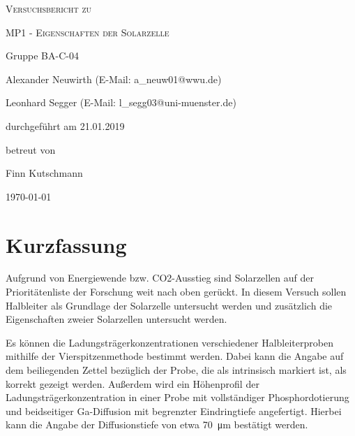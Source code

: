 \documentclass[
	a4paper,
	12pt,
	pagesize,
	ngerman
]{scrartcl}
\begin{document}
	\begin{titlepage}
		\centering
		{\scshape\LARGE Versuchsbericht zu \par}
		\vspace{1cm}
		{\scshape\huge MP1 - Eigenschaften der Solarzelle \par} %
		\vspace{2.5cm}
		{\LARGE Gruppe BA-C-04 \par}
		\vspace{0.5cm}

		{\large Alexander Neuwirth (E-Mail: a\_neuw01@wwu.de) \par}
		{\large Leonhard Segger (E-Mail: l\_segg03@uni-muenster.de) \par}
		\vfill

		durchgeführt am 21.01.2019\par
		betreut von\par
		{\large Finn Kutschmann}

		\vfill

		{\large \today\par}
	\end{titlepage}
	\tableofcontents
	\newpage


	\section{Kurzfassung}
	Aufgrund von Energiewende bzw. CO2-Ausstieg sind Solarzellen auf der Prioritätenliste der Forschung weit nach oben gerückt.
	In diesem Versuch sollen Halbleiter als Grundlage der Solarzelle untersucht werden und zusätzlich die Eigenschaften zweier Solarzellen untersucht werden.

	Es können die Ladungsträgerkonzentrationen verschiedener Halbleiterproben mithilfe der Vierspitzenmethode bestimmt werden.
	Dabei kann die Angabe auf dem beiliegenden Zettel bezüglich der Probe, die als intrinsisch markiert ist, als korrekt gezeigt werden.
	Außerdem wird ein Höhenprofil der Ladungsträgerkonzentration in einer Probe mit vollständiger Phosphordotierung und beidseitiger Ga-Diffusion mit begrenzter Eindringtiefe angefertigt. %
	Hierbei kann die Angabe der Diffusionstiefe von etwa \SI{70}{\micro \meter} bestätigt werden.
\end{document}
